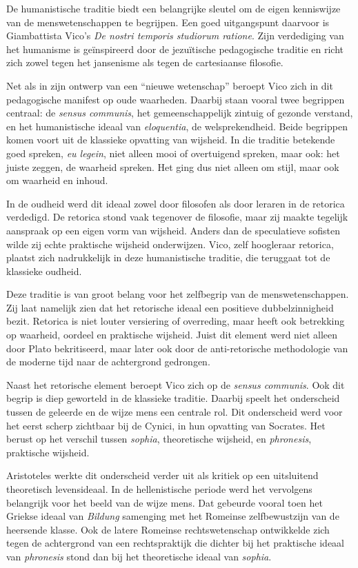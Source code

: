 De humanistische traditie biedt een belangrijke sleutel om de eigen kenniswijze van de menswetenschappen te begrijpen. Een goed uitgangspunt daarvoor is Giambattista Vico's \textit{De nostri temporis studiorum ratione}. Zijn verdediging van het humanisme is geïnspireerd door de jezuïtische pedagogische traditie en richt zich zowel tegen het jansenisme als tegen de cartesiaanse filosofie.

Net als in zijn ontwerp van een ``nieuwe wetenschap'' beroept Vico zich in dit pedagogische manifest op oude waarheden. Daarbij staan vooral twee begrippen centraal: de \textit{sensus communis}, het gemeenschappelijk zintuig of gezonde verstand, en het humanistische ideaal van \textit{eloquentia}, de welsprekendheid. Beide begrippen komen voort uit de klassieke opvatting van wijsheid. In die traditie betekende goed spreken, \textit{eu legein}, niet alleen mooi of overtuigend spreken, maar ook: het juiste zeggen, de waarheid spreken. Het ging dus niet alleen om stijl, maar ook om waarheid en inhoud.

In de oudheid werd dit ideaal zowel door filosofen als door leraren in de retorica verdedigd. De retorica stond vaak tegenover de filosofie, maar zij maakte tegelijk aanspraak op een eigen vorm van wijsheid. Anders dan de speculatieve sofisten wilde zij echte praktische wijsheid onderwijzen. Vico, zelf hoogleraar retorica, plaatst zich nadrukkelijk in deze humanistische traditie, die teruggaat tot de klassieke oudheid.

Deze traditie is van groot belang voor het zelfbegrip van de menswetenschappen. Zij laat namelijk zien dat het retorische ideaal een positieve dubbelzinnigheid bezit. Retorica is niet louter versiering of overreding, maar heeft ook betrekking op waarheid, oordeel en praktische wijsheid. Juist dit element werd niet alleen door Plato bekritiseerd, maar later ook door de anti-retorische methodologie van de moderne tijd naar de achtergrond gedrongen.

Naast het retorische element beroept Vico zich op de \textit{sensus communis}. Ook dit begrip is diep geworteld in de klassieke traditie. Daarbij speelt het onderscheid tussen de geleerde en de wijze mens een centrale rol. Dit onderscheid werd voor het eerst scherp zichtbaar bij de Cynici, in hun opvatting van Socrates. Het berust op het verschil tussen \textit{sophia}, theoretische wijsheid, en \textit{phronesis}, praktische wijsheid.

Aristoteles werkte dit onderscheid verder uit als kritiek op een uitsluitend theoretisch levensideaal. In de hellenistische periode werd het vervolgens belangrijk voor het beeld van de wijze mens. Dat gebeurde vooral toen het Griekse ideaal van \textit{Bildung} samenging met het Romeinse zelfbewustzijn van de heersende klasse. Ook de latere Romeinse rechtswetenschap ontwikkelde zich tegen de achtergrond van een rechtspraktijk die dichter bij het praktische ideaal van \textit{phronesis} stond dan bij het theoretische ideaal van \textit{sophia}.

